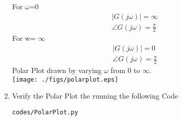 \begin{enumerate}[label=\thesubsection.\arabic*.,ref=\thesubsection.\theenumi]
For $\omega$=0 
\begin{align}
    |G(j\omega)| = \infty\\
    \angle G(j\omega) = \frac{\pi}{2}
\end{align}
For w= $\infty$
\begin{align}
    |G(j\omega)| = 0\\
    \angle G(j\omega) = \frac{\pi}{2}
\end{align}
Polar Plot drawn by varying $\omega$ from 0 to $\infty$.\\
\texttt{[image: ./figs/polarplot.eps]}
\item
Verify the Polar Plot the running the following Code\\
\begin{lstlisting}
codes/PolarPlot.py
\end{lstlisting}
\end{enumerate}

